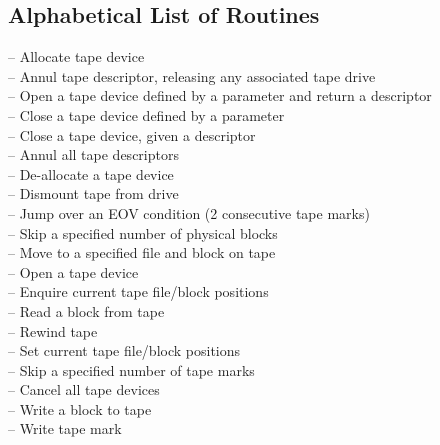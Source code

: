 \appendix
\begin{latexonly}
\section{Alphabetical List of Routines}
 --   Allocate tape device \\
 --   Annul tape descriptor, releasing any associated tape drive \\
 --   Open a tape device defined by a
parameter and return a descriptor \\
 --   Close a tape device defined by a parameter\\
 --   Close a tape device, given a descriptor \\
 --   Annul all tape descriptors \\
 --   De-allocate a tape device \\
 --   Dismount tape from drive \\
 --   Jump over an EOV condition (2 consecutive tape marks) \\
 --   Skip a specified number of physical blocks \\
 --   Move to a specified file and block on tape \\
 --   Open a tape device \\
 --   Enquire current tape file/block positions \\
 --   Read a block from tape \\
 --   Rewind tape \\
 --   Set current tape file/block positions \\
 --   Skip a specified number of tape marks \\
 --   Cancel all tape devices \\
 --   Write a block to tape \\
 --   Write tape mark
\end{latexonly}

